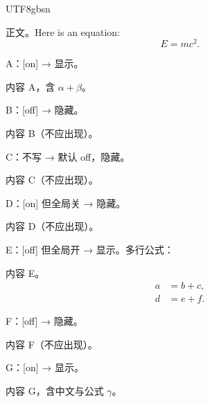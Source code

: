 \documentclass[11pt]{article}
\newif\ifglobalnote   %
\newif\ifglobalset    %
\newcommand{\globalnoteon}{%
	\global\let\ifglobalset\iftrue
	\global\let\ifglobalnote\iftrue}
\newcommand{\globalnoteoff}{%
	\global\let\ifglobalset\iftrue
	\global\let\ifglobalnote\iffalse}
\newcommand{\globalnoteauto}{%
	\global\let\ifglobalset\iffalse}
\begin{document}
	\begin{CJK*}{UTF8}{gbsn}
		
		正文。Here is an equation:
		\begin{equation}
			E = mc^2.
		\end{equation}
		
		A：[on] → 显示。
		\begin{mynote}[on]
			内容 A，含 \( \alpha+\beta \)。
		\end{mynote}
		
		B：[off] → 隐藏。
		\begin{mynote}[off]
			内容 B（不应出现）。
		\end{mynote}
		
		C：不写 → 默认 off，隐藏。
		\begin{mynote}
			内容 C（不应出现）。
		\end{mynote}
		
		\globalnoteoff
		D：[on] 但全局关 → 隐藏。
		\begin{mynote}[on]
			内容 D（不应出现）。
		\end{mynote}
		
		\globalnoteon
		E：[off] 但全局开 → 显示。多行公式：
		\begin{mynote}[off]
			内容 E。
			\begin{align}
				a &= b + c, \\
				d &= e + f.
			\end{align}
		\end{mynote}
		
		\globalnoteauto   %
		F：[off] → 隐藏。
		\begin{mynote}[off]
			内容 F（不应出现）。
		\end{mynote}
		
		G：[on] → 显示。
		\begin{mynote}[on]
			内容 G，含中文与公式 \( \gamma \)。
		\end{mynote}
		
	\end{CJK*}
\end{document}
